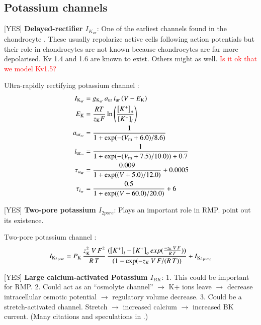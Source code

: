 \subsection{Potassium channels}
\label{sec:potassium-channels}

[YES] {\bf Delayed-rectifier $I_{K_{ur}}$}: One of the earliest channels
found in the chondrocyte \citep{Walshetal1992, Sugimotoetal1996,
  Mobasherietal2005}. These usually repolarize active cells following
action potentials but their role in chondrocytes are not known because
chondrocytes are far more depolarised. Kv 1.4 and 1.6
\citep{Clarketal2010, Mobasherietal2005} are known to exist. Others
might as well. \textcolor{red}{Is it ok that we model Kv1.5?}

Ultra-rapidly rectifying potassium channel \citep{Maleckaretal2009}:
\begin{equation}
  \begin{split}
    I_{\rm K_{\rm ur}} & = g_{\rm K_{\rm ur}}\, a_{\rm ur}\, i_{\rm
      ur}\, (V - E_{\rm K})\\
    E_{\rm K} & =  \frac{R T}{z_{\rm K} F}
    \ln\left(\frac{\left[K^{+}\right]_{o}}
      {\left[K^{+}\right]_{i}}\right)\\
    a_{{\rm ur}_{\infty}} & = \frac{1}{1 + \exp(-(V_{\rm m} +
      6.0)/8.6)}\\
    i_{{\rm ur}_{\infty}} & = \frac{1}{1 + \exp(-(V_{\rm m} +
      7.5)/10.0)) + 0.7}\\
    \tau_{a_{\rm ur}} & = \frac{0.009}{1 + \exp((V + 5.0)/12.0)} +
    0.0005\\
    \tau_{i_{\rm ur}} & = \frac{0.5}{1 + \exp((V +60.0)/20.0)} +
    6\\
  \end{split}
\end{equation}

[YES] {\bf Two-pore potassium $I_{2 pore}$}: Plays an important role
in RMP. \citep{Clarketal2011} point out its existence.

Two-pore potassium channel \citep{UNKNOWN}:
\begin{equation}
 I_{\rm K_{2\, pore}} = P_{\rm K}\, \frac{z_{\rm K}^2\, V\, F^{2}}{R\,
   T}\, \frac{({\left[K^{+}\right]_{i}} - {\left[K^{+}\right]_{o}}\,
 exp(\frac{-z_{\rm K}\, V\, F}{R\, T}))}{(1 - \exp(-z_K\, V\, F/(R\,
 T))} + I_{{\rm K_{2\, pore}}_0}
\end{equation}

[YES] {\bf Large calcium-activated Potassium $I_{BK}$}: 1. This could
be important for RMP. 2. Could act as an ``osmolyte channel''
$\rightarrow$ K+ ions leave $\rightarrow$ decrease intracellular
osmotic potential $\rightarrow$ regulatory volume decrease. 3. Could
be a stretch-activated channel. Stretch $\rightarrow$ increased
calcium $\rightarrow$ increased BK current. (Many citations and
speculations in \citet{BarrettJolleyetal2010}.)

